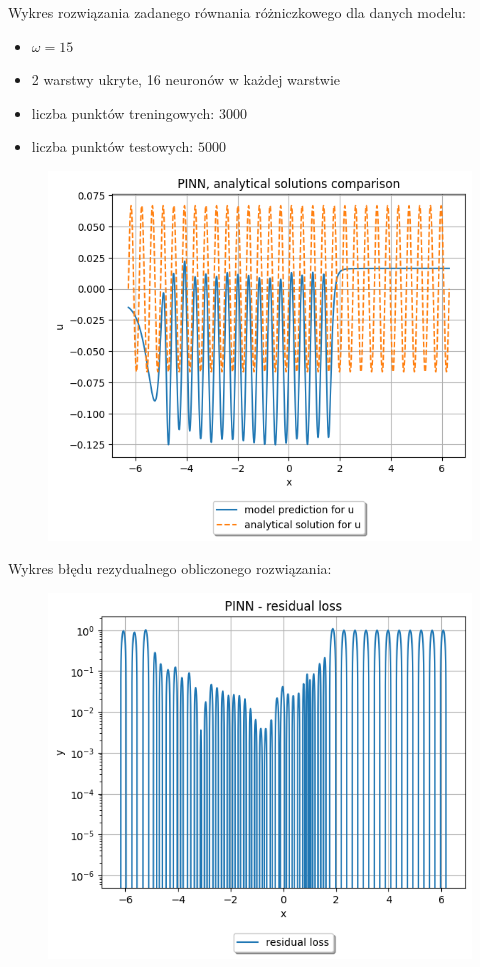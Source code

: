 \documentclass{article}
\begin{document}
Wykres rozwiązania zadanego równania różniczkowego dla danych modelu:\\
\begin{itemize}
  \item $\omega = 15$\\
  \item 2 warstwy ukryte, 16 neuronów w każdej warstwie\\
  \item liczba punktów treningowych: $3000$\\
  \item liczba punktów testowych: $5000$
\end{itemize}

\begin{figure}[H]
  \includegraphics[width=\linewidth]{figures/2.png}
\end{figure}

Wykres błędu rezydualnego obliczonego rozwiązania:\\

\begin{figure}[H]
  \includegraphics[width=\linewidth]{figures/2_residual.png}
\end{figure}
\end{document}
